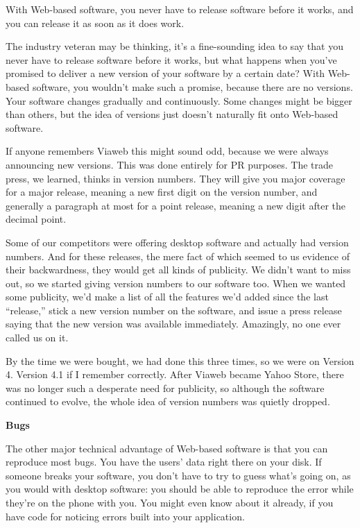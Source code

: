With Web-based software, you never have to release software before it
works, and you can release it as soon as it does work.

The industry veteran may be thinking, it's a fine-sounding idea to say
that you never have to release software before it works, but what
happens when you've promised to deliver a new version of your software
by a certain date? With Web-based software, you wouldn't make such a
promise, because there are no versions. Your software changes gradually
and continuously. Some changes might be bigger than others, but the idea
of versions just doesn't naturally fit onto Web-based software.

If anyone remembers Viaweb this might sound odd, because we were always
announcing new versions. This was done entirely for PR purposes. The
trade press, we learned, thinks in version numbers. They will give you
major coverage for a major release, meaning a new first digit on the
version number, and generally a paragraph at most for a point release,
meaning a new digit after the decimal point.

Some of our competitors were offering desktop software and actually had
version numbers. And for these releases, the mere fact of which seemed
to us evidence of their backwardness, they would get all kinds of
publicity. We didn't want to miss out, so we started giving version
numbers to our software too. When we wanted some publicity, we'd make a
list of all the features we'd added since the last ``release,'' stick a
new version number on the software, and issue a press release saying
that the new version was available immediately. Amazingly, no one ever
called us on it.

By the time we were bought, we had done this three times, so we were on
Version 4. Version 4.1 if I remember correctly. After Viaweb became
Yahoo Store, there was no longer such a desperate need for publicity, so
although the software continued to evolve, the whole idea of version
numbers was quietly dropped.

\textbf{Bugs}

The other major technical advantage of Web-based software is that you
can reproduce most bugs. You have the users' data right there on your
disk. If someone breaks your software, you don't have to try to guess
what's going on, as you would with desktop software: you should be able
to reproduce the error while they're on the phone with you. You might
even know about it already, if you have code for noticing errors built
into your application.

